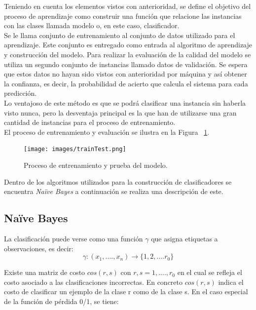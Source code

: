 Teniendo en cuenta los elementos vistos con anterioridad, se define el objetivo del proceso de aprendizaje como construir una función que relacione las instancias con las clases llamada modelo o, en este caso, clasificador.\\

Se le llama conjunto de entrenamiento al conjunto de datos utilizado para el aprendizaje. Este conjunto es entregado como entrada al algoritmo de aprendizaje y construcción del modelo. Para realizar la evaluación de la calidad del modelo se utiliza un segundo conjunto de instancias llamado datos de validación. Se espera que estos datos no hayan sido vistos con anterioridad por máquina y así obtener la confianza, es decir, la probabilidad de acierto que calcula el sistema para cada predicción.\\

Lo ventajoso de este método es que se podrá clasificar una instancia sin haberla visto nunca, pero la desventaja principal es la que han de utilizarse una gran cantidad de instancias para el proceso de entrenamiento.\\

El proceso de entrenamiento y evaluación se ilustra en la Figura ~\ref{fig:entrenamientoEvaluacion}.

\begin{figure}[!ht]
	\centering
	\captionsetup{justification=centering}
	\texttt{[image: images/trainTest.png]}
	\caption[Proceso de entrenamiento y prueba del modelo.]{Proceso de entrenamiento y prueba del modelo.}
	\label{fig:entrenamientoEvaluacion}
\end{figure}

Dentro de los algoritmos utilizados para la construcción de clasificadores se encuentra \textit{Naïve Bayes} a continuación se realiza una descripción de este. 

	\subsection{Naïve Bayes}
	
	La clasificación puede verse como una función \begin{math}\gamma\end{math} que asigna etiquetas a observaciones, es decir:\\ 
	\[\gamma : (x_{1}, .... , x_{n}) \rightarrow \{1, 2, .... r_{0}\} \]

	Existe una matriz de costo \begin{math} cos(r, s)\end{math} con \begin{math} r, s = 1, ...., r_{0}\end{math} en el cual se refleja el costo asociado a las clasificaciones incorrectas. En concreto \begin{math} cos(r, s) \end{math} indica el costo de clasificar un ejemplo de la clase r como de la clase s. En el caso especial de la función de pérdida 0/1, se tiene:\\


